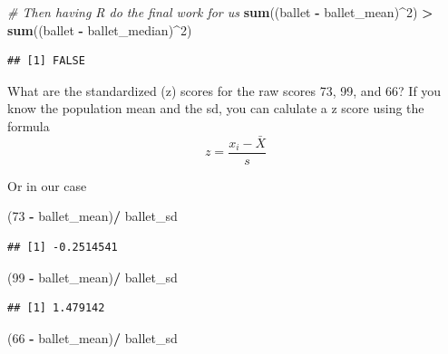 \documentclass[]{book}
\newenvironment{Shaded}{\begin{snugshade}}{\end{snugshade}}
\newcommand{\KeywordTok}[1]{\textcolor[rgb]{0.13,0.29,0.53}{\textbf{#1}}}
\newcommand{\DecValTok}[1]{\textcolor[rgb]{0.00,0.00,0.81}{#1}}
\newcommand{\StringTok}[1]{\textcolor[rgb]{0.31,0.60,0.02}{#1}}
\newcommand{\CommentTok}[1]{\textcolor[rgb]{0.56,0.35,0.01}{\textit{#1}}}
\newcommand{\OperatorTok}[1]{\textcolor[rgb]{0.81,0.36,0.00}{\textbf{#1}}}
\newcommand{\NormalTok}[1]{#1}
\theoremstyle{definition}
\theoremstyle{definition}
\theoremstyle{definition}
\theoremstyle{remark}
\begin{document}
\begin{Shaded}
\begin{Highlighting}[]
\CommentTok{# Then having R do the final work for us}
\KeywordTok{sum}\NormalTok{((ballet }\OperatorTok{-}\StringTok{ }\NormalTok{ballet_mean)}\OperatorTok{^}\DecValTok{2}\NormalTok{) }\OperatorTok{>}\StringTok{ }\KeywordTok{sum}\NormalTok{((ballet }\OperatorTok{-}\StringTok{ }\NormalTok{ballet_median)}\OperatorTok{^}\DecValTok{2}\NormalTok{)}
\end{Highlighting}
\end{Shaded}

\begin{verbatim}
## [1] FALSE
\end{verbatim}

What are the standardized (z) scores for the raw scores 73, 99, and 66?
If you know the population mean and the sd, you can calulate a z score
using the formula \[z =  \frac{x_i - \bar{X}}{s}\]

Or in our case

\begin{Shaded}
\begin{Highlighting}[]
\NormalTok{(}\DecValTok{73} \OperatorTok{-}\StringTok{ }\NormalTok{ballet_mean)}\OperatorTok{/}\StringTok{ }\NormalTok{ballet_sd}
\end{Highlighting}
\end{Shaded}

\begin{verbatim}
## [1] -0.2514541
\end{verbatim}

\begin{Shaded}
\begin{Highlighting}[]
\NormalTok{(}\DecValTok{99} \OperatorTok{-}\StringTok{ }\NormalTok{ballet_mean)}\OperatorTok{/}\StringTok{ }\NormalTok{ballet_sd}
\end{Highlighting}
\end{Shaded}

\begin{verbatim}
## [1] 1.479142
\end{verbatim}

\begin{Shaded}
\begin{Highlighting}[]
\NormalTok{(}\DecValTok{66} \OperatorTok{-}\StringTok{ }\NormalTok{ballet_mean)}\OperatorTok{/}\StringTok{ }\NormalTok{ballet_sd}
\end{Highlighting}
\end{Shaded}
\end{document}

